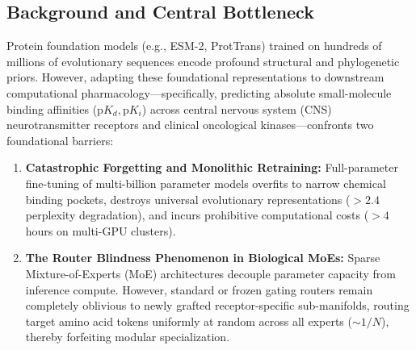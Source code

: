 \documentclass[11pt,a4paper]{article}
\begin{document}
\subsection*{Background and Central Bottleneck}
Protein foundation models (e.g., ESM-2, ProtTrans) trained on hundreds of millions of evolutionary sequences encode profound structural and phylogenetic priors. However, adapting these foundational representations to downstream computational pharmacology---specifically, predicting absolute small-molecule binding affinities ($\mathrm{p}K_d, \mathrm{p}K_i$) across central nervous system (CNS) neurotransmitter receptors and clinical oncological kinases---confronts two foundational barriers:
\begin{enumerate}
    \item \textbf{Catastrophic Forgetting and Monolithic Retraining:} Full-parameter fine-tuning of multi-billion parameter models overfits to narrow chemical binding pockets, destroys universal evolutionary representations ($>2.4$ perplexity degradation), and incurs prohibitive computational costs ($>4$ hours on multi-GPU clusters).
    \item \textbf{The Router Blindness Phenomenon in Biological MoEs:} Sparse Mixture-of-Experts (MoE) architectures decouple parameter capacity from inference compute. However, standard or frozen gating routers remain completely oblivious to newly grafted receptor-specific sub-manifolds, routing target amino acid tokens uniformly at random across all experts ($\sim 1/N$), thereby forfeiting modular specialization.
\end{enumerate}
\end{document}
